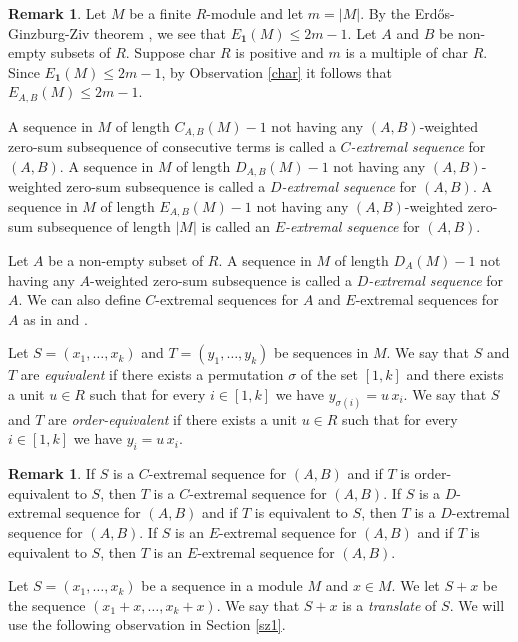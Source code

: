 \documentclass{article}[11pt]
\theoremstyle{definition}
\newtheorem{remark}[theorem]{Remark}
\begin{document}
\begin{remark}\label{upbdd}
Let $M$ be a finite $R$-module and let $m=|M|$. By the Erd\H{o}s-Ginzburg-Ziv theorem \cite{EGZ}, we see that $E_\mathbf 1 (M)\leq 2m-1$. Let $A$ and $B$ be non-empty subsets of $R$. Suppose char $R$ is positive and $m$ is a multiple of char $R$. Since $E_\mathbf 1(M)\leq 2m-1$, by Observation \ref{char} it follows that $E_{A,B}(M)\leq 2m-1$.
\end{remark}

A sequence in $M$ of length $C_{A,B}(M)-1$ not having any $(A,B)$-weighted zero-sum subsequence of consecutive terms is called a {\it $C$-extremal sequence} for $(A,B)$. A sequence in $M$ of length $D_{A,B}(M)-1$ not having any $(A,B)$-weighted zero-sum subsequence is called a {\it $D$-extremal sequence} for $(A,B)$. A sequence in $M$ of length $E_{A,B}(M)-1$ not having any $(A,B)$-weighted zero-sum subsequence of length $|M|$ is called an {\it $E$-extremal sequence} for $(A,B)$.

Let $A$ be a non-empty subset of $R$. A sequence in $M$ of length $D_A(M)-1$ not having any $A$-weighted zero-sum subsequence is called a {\it $D$-extremal sequence} for $A$. We can also define $C$-extremal sequences for $A$ and $E$-extremal sequences for $A$ as in \cite{SKS2} and \cite{SKS3}.

Let $S=(x_1,\ldots,x_k)$ and $T=(y_1,\ldots,y_k)$ be sequences in $M$. We say that $S$ and $T$ are {\it equivalent} if there exists a permutation $\sigma$ of the set $[1,k]$ and there exists a unit $u\in R$ such that for every $i\in [1,k]$ we have $y_{\sigma(i)}=u\,x_i$. We say that $S$ and $T$ are {\it order-equivalent} if there exists a unit $u\in R$ such that for every $i\in [1,k]$ we have $y_i=u\,x_i$.


\begin{remark}\label{eq}
If $S$ is a $C$-extremal sequence for $(A,B)$ and if $T$ is order-equivalent to $S$, then $T$ is a $C$-extremal sequence for $(A,B)$. If $S$ is a $D$-extremal sequence for $(A,B)$ and if $T$ is equivalent to $S$, then $T$ is a $D$-extremal sequence for $(A,B)$. If $S$ is an $E$-extremal sequence for $(A,B)$ and if $T$ is equivalent to $S$, then $T$ is an $E$-extremal sequence for $(A,B)$.
\end{remark}

Let $S=(x_1,\ldots,x_k)$ be a sequence in a module $M$ and $x\in M$. We let $S+x$ be the sequence $(x_1+x,\ldots,x_k+x)$. We say that $S+x$ is a {\it translate} of $S$. We will use the following observation in Section \ref{sz1}.
\end{document}
